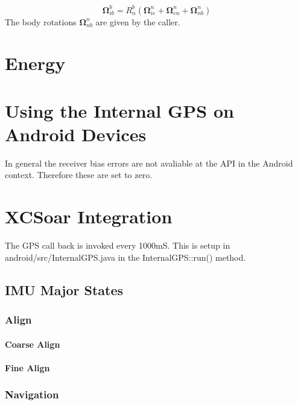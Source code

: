 \documentclass[a4paper]{report}
\numberwithin{equation}{chapter}
\newcommand{\mat}[1]{\boldsymbol{#1}}
\begin{document}
\begin{equation}
\mat{\Omega}^b_{ib} = R^b_n \left( \mat{\Omega}^n_{ie} + \mat{\Omega}^n_{en} + \mat{\Omega}^n_{nb} \right)
\end{equation}
The body rotations $\mat{\Omega}^n_{nb}$ are given by the caller.

\clearpage\setcounter{page}{1}
\chapter[Energy]{Energy}

\clearpage\setcounter{page}{1}
\chapter[Using the Internal GPS on Android Devices]{Using the Internal GPS on Android Devices}

In general the receiver bias errors are not avaliable at the API in the Android context. Therefore these are set to zero.

\clearpage\setcounter{page}{1}
\chapter[XCSoar Integration]{XCSoar Integration}

The GPS call back is invoked every 1000mS. This is setup in android/src/InternalGPS.java in the InternalGPS::run() method.

\section[IMU Major States]{IMU Major States}

\subsection[Align]{Align}

\subsubsection[Coarse Align]{Coarse Align}

\subsubsection[Fine Align]{Fine Align}

\subsection[Navigate]{Navigation}
\end{document}

